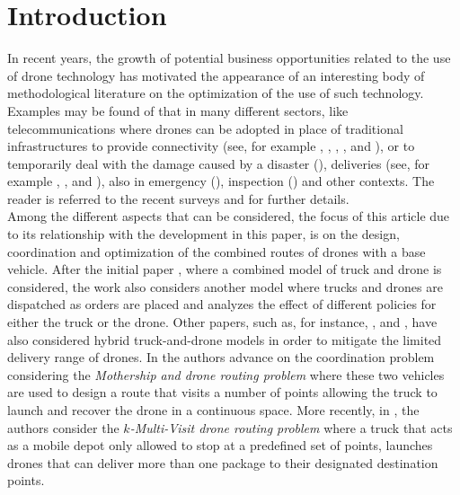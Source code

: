 \documentclass[10pt,a4paper]{elsarticle}
\newcommand{\EN}[1]{{\color{black}#1}}
\begin{document}
\section{Introduction}
\noindent
In recent years, the grow\EN{th} of potential business opportunities related to the use of drone technology ha\EN{s} motivated the appearance of an interesting body of methodological literature on the optimization of the use of such technology. 
\EN{Examples may be found} of that in many different sectors, like telecommunications where drones can be adopted in place of traditional infrastructures to provide connectivity (see, for example \cite{art:Amorosi2018}, \cite{art:Chiaraviglio2018}, \cite{Jimenez2018}, \cite{art:Amorosi2019}, and \cite{art:Chiaraviglio2019a}), or to temporar\EN{il}y deal with the damage caused by a disaster (\cite{art:Chiaraviglio2019}), deliveries (see, for example \cite{art:Mathew2015} , \cite{art:Ferrandez2016}, \cite{art:Poikonen2020} and \cite{art:Amorosi2020}), also in emergency (\cite{art:Wen2016}), inspection (\cite{art:Trotta2018}) and other \EN{contexts}.
The reader is referred to the recent surveys \cite{art:Otto2018} and \cite{art:Chung2020} for further details.\\
\noindent
Among the different aspects that can be considered, \EN{the focus of this article} due to its relationship with the development in this paper, \EN{is on} the design, coordination and optimization of the combined routes of drones with a base vehicle. After the initial paper \cite{MURRAY201586}, where a combined model of truck and drone is considered, the work \cite{Ulmer2018} also considers another model where trucks and drones are dispatched as orders are placed and analyze\EN{s} the effect of different policies for either the truck or the drone. Other papers, \EN{such} as, for instance, \cite{art:Campbell2017}, \cite{art:Carlsson2017} and \cite{art:Dayarian2017}, have also considered hybrid truck-and-drone models in order to mitigate the limited delivery range of drones. In \cite{Poikonen2019} the authors advance on the coordination problem considering the \textit{Mothership and drone routing problem} where these two vehicles are used to design a route that visits a number of points allowing the truck to launch and recover the drone in a continuous space. More recently, in \cite{art:Poikonen2020}, the authors consider the \textit{$k$-Multi-Visit drone routing problem} where a truck that acts as a mobile depot only allowed to stop \EN{at} a predefined set of points, launches drones that can deliver more than one package to their designated destination points. 
\end{document}
